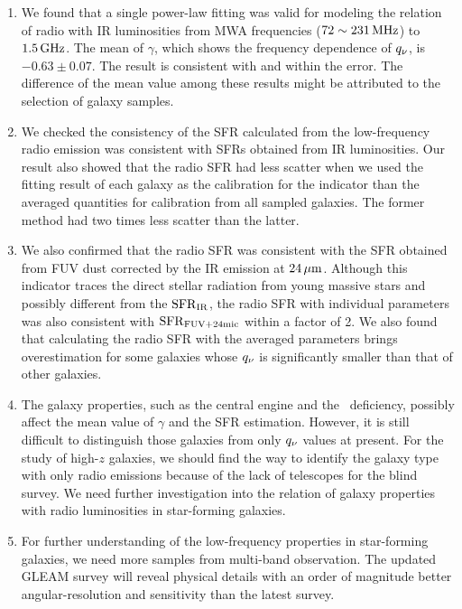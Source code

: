\begin{enumerate}
    \item We found that a single power-law fitting was valid for modeling the relation of radio with IR luminosities from MWA frequencies ($72\sim231\,\mathrm{MHz}$) to $1.5\,\mathrm{GHz}$.
        The mean of $\gamma$, which shows the frequency dependence of $q_{\nu}$, is $-0.63\pm0.07$.
        The result is consistent with \citet{CalistroRivera2017a} and \citet{Chyzy2018} within the error.
        The difference of the mean value among these results might be attributed to the selection of galaxy samples.
    \item We checked the consistency of the SFR calculated from the low-frequency radio emission was consistent with SFRs obtained from IR luminosities.
        Our result also showed that the radio SFR had less scatter when we used the fitting result of each galaxy as the calibration for the indicator than the averaged quantities for calibration from all sampled galaxies.
        The former method had two times less scatter than the latter.
    \item We also confirmed that the radio SFR was consistent with the SFR obtained from FUV dust corrected by the IR emission at $24\,\mathrm{\mu m}$.
        Although this indicator traces the direct stellar radiation from young massive stars and possibly different from the $\mathrm{SFR}_{\mathrm{IR}}$, the radio SFR with individual parameters was also consistent with $\mathrm{SFR}_{\mathrm{FUV+24mic}}$ within a factor of 2.
        We also found that calculating the radio SFR with the averaged parameters brings overestimation for some galaxies whose $q_{\nu}$ is significantly smaller than that of other galaxies.
    \item The galaxy properties, such as the central engine and the \nh~deficiency, possibly affect the mean value of $\gamma$ and the SFR estimation.
        However, it is still difficult to distinguish those galaxies from only $q_{\nu}$ values at present.
        For the study of high-$z$ galaxies, we should find the way to identify the galaxy type with only radio emissions because of the lack of telescopes for the blind survey.
        We need further investigation into the relation of galaxy properties with radio luminosities in star-forming galaxies.
    \item For further understanding of the low-frequency properties in star-forming galaxies, we need more samples from multi-band observation.
        The updated GLEAM survey will reveal physical details with an order of magnitude better angular-resolution and sensitivity than the latest survey.
\end{enumerate}


